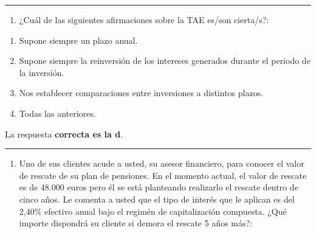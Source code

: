 \documentclass[
  letterpaper,
  DIV=11,
  numbers=noendperiod]{scrreprt}
\providecommand{\tightlist}{%
  \setlength{\itemsep}{0pt}\setlength{\parskip}{0pt}}\usepackage{longtable,booktabs,array}
\begin{document}
\begin{center}\rule{0.5\linewidth}{0.5pt}\end{center}

\begin{enumerate}
\def\labelenumi{\arabic{enumi}.}
\setcounter{enumi}{30}
\tightlist
\item
  ¿Cuál de las siguientes afirmaciones sobre la TAE es/son cierta/s?:
\end{enumerate}

\begin{enumerate}
\def\labelenumi{\alph{enumi})}
\item
  Supone siempre un plazo anual.
\item
  Supone siempre la reinversión de los intereses generados durante el
  periodo de la inversión.
\item
  Nos establecer comparaciones entre inversiones a distintos plazos.
\item
  Todas las anteriores.
\end{enumerate}

\begin{tcolorbox}[enhanced jigsaw, left=2mm, opacityback=0, colback=white, breakable, arc=.35mm, bottomrule=.15mm, rightrule=.15mm, toprule=.15mm, leftrule=.75mm, colframe=quarto-callout-tip-color-frame]
\begin{minipage}[t]{5.5mm}
\textcolor{quarto-callout-tip-color}{\faLightbulb}
\end{minipage}%
\begin{minipage}[t]{\textwidth - 5.5mm}

La respuesta \textbf{correcta es la d}.

\end{minipage}%
\end{tcolorbox}

\begin{center}\rule{0.5\linewidth}{0.5pt}\end{center}

\begin{enumerate}
\def\labelenumi{\arabic{enumi}.}
\setcounter{enumi}{31}
\tightlist
\item
  Uno de sus clientes acude a usted, su asesor financiero, para conocer
  el valor de rescate de su plan de pensiones. En el momento actual, el
  valor de rescate es de 48.000 euros pero él se está planteando
  realizarlo el rescate dentro de cinco años. Le comenta a usted que el
  tipo de interés que le aplican es del 2,40\% efectivo anual bajo el
  regimén de capitalización compuesta. ¿Qué importe dispondrá su cliente
  si demora el rescate 5 años más?:
\end{enumerate}
\end{document}
